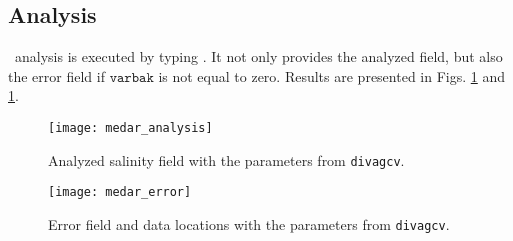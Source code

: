 \subsection{Analysis}

\diva\, analysis is executed by typing . It not only provides the analyzed field, but also the error field if $\texttt{varbak}$ is not equal to zero. Results are presented in Figs. \ref{analysisCL1} and \ref{analysisCL1}.

\begin{figure}[htpb]
\centering
\texttt{[image: medar\_analysis]}
\caption{Analyzed salinity field with the parameters from \texttt{divagcv}.\label{analysisCL1}}
\end{figure}


\begin{figure}[htpb]
\centering
\texttt{[image: medar\_error]}
\caption{Error field and data locations with the parameters from \texttt{divagcv}.\label{errorCL1}}
\end{figure}



\clearpage
%




%
%



